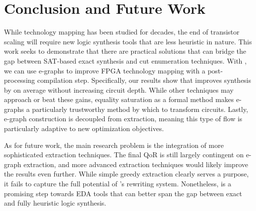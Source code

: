 \section{Conclusion and Future Work}\label{sec:conclusion}
While technology mapping has been studied for decades, the end of transistor
scaling will require new logic synthesis tools that are less heuristic in
nature. This work seeks to demonstrate that there are practical solutions that
can bridge the gap between SAT-based exact synthesis and cut enumeration
techniques. With \shortname{}, we can use e-graphs to improve FPGA technology
mapping with a post-processing compilation step. Specifically, our results show
that \shortname{} improves synthesis by \metric{} on average without increasing
circuit depth. While other techniques may approach or beat these gains,
equality saturation as a formal method makes e-graphs a particularly
trustworthy method by which to transform circuits. Lastly, e-graph construction
is decoupled from extraction, meaning this type of flow is particularly
adaptive to new optimization objectives.

As for future work, the main research problem is the integration of more
sophisticated extraction techniques. The final QoR is still largely contingent
on e-graph extraction, and more advanced extraction techniques would likely
improve the results even further. While simple greedy extraction clearly serves
a purpose, it fails to capture the full potential of \shortname{}'s rewriting
system. Nonetheless, \shortname{} is a promising step towards EDA tools that
can better span the gap between exact and fully heuristic logic synthesis.
